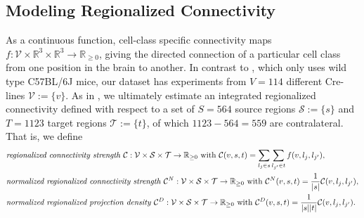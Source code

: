 


\newpage

\subsection{Modeling Regionalized Connectivity}
\label{sec:modelling}

As a continuous function, cell-class specific connectivity maps $f:  \mathcal V \times \mathbb R^3 \times \mathbb R^3 \to \mathbb R_{\geq 0}$, giving the directed connection of a particular cell class from one position in the brain to another.
In contrast to \citet{Knox2019-ot}, which only uses wild type C57BL/6J mice, our dataset has experiments from $V = 114$ different Cre-lines $\mathcal V := \{v\}$.
As in \citet{Knox2019-ot}, we ultimately estimate an integrated regionalized connectivity defined with respect to a set of $S = 564$ source regions $\mathcal S := \{ s\} $ and $T = 1123$ target regions $\mathcal T := \{ t \}$, of which $1123 - 564  = 559$ are contralateral.
That is, we define
\begin{align*}
&\text{\textit {regionalized connectivity strength} } \mathcal C : \mathcal V \times \mathcal S \times \mathcal T \to \mathbb R_{\geq 0}  \text{ with } \mathcal C(v,s,t) = \sum_{l_{j} \in s} \sum_{l_{j'} \in  t} f(v,l_{j},l_{j'}), \\
&\text{\textit {normalized regionalized connectivity strength} } \mathcal C^N : \mathcal V \times \mathcal S \times \mathcal T \to \mathbb R_{\geq 0}  \text{ with } \mathcal C^N(v,s,t) = \frac{1}{|s|} \mathcal C(v,l_{j},l_{j'}), \\
&\text{\textit {normalized regionalized projection density} } \mathcal C^D : \mathcal V \times \mathcal S \times \mathcal T \to \mathbb R_{\geq 0} \text{ with } \mathcal C^D(v,s,t) = \frac{1}{| s | | t|}\mathcal C(v,l_{j},l_{j'}).
\end{align*}

